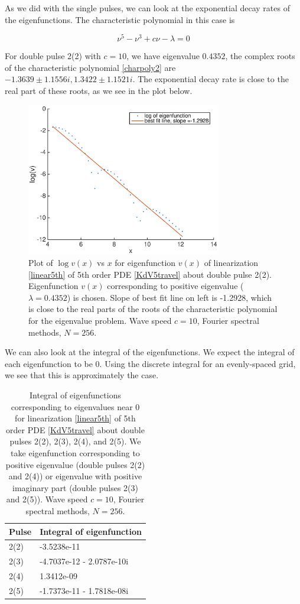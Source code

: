 \documentclass[12pt]{article}
\begin{document}
As we did with the single pulses, we can look at the exponential decay rates of the eigenfunctions. The characteristic polynomial in this case is 

\begin{equation} \label{charpoly2}
\nu^5 - \nu^3 + c \nu - \lambda = 0
\end{equation}

For double pulse 2(2) with $c = 10$, we have eigenvalue $0.4352$, the complex roots of the characteristic polynomial \eqref{charpoly2} are $-1.3639 \pm 1.1556i, 1.3422 \pm 1.1521i$. The exponential decay rate is close to the real part of these roots, as we see in the plot below.

\begin{figure}[H]
	\includegraphics[width=8.5cm]{decayeigenfunction}
	\caption{Plot of $\log v(x)$ vs $x$ for eigenfunction $v(x)$ of linearization \eqref{linear5th} of 5th order PDE \eqref{KdV5travel} about double pulse 2(2). Eigenfunction $v(x)$ corresponding to positive eigenvalue ($\lambda = 0.4352$) is chosen. Slope of best fit line on left is -1.2928, which is close to the real parts of the roots of the characteristic polynomial for the eigenvalue problem. Wave speed $c = 10$, Fourier spectral methods, $N = 256$.}
\end{figure}

We can also look at the integral of the eigenfunctions. We expect the integral of each eigenfunction to be 0. Using the discrete integral for an evenly-spaced grid, we see that this is approximately the case.

\begin{table}[H]
\begin{tabular}{l|l}
Pulse  & Integral of eigenfunction \\ \hline
2(2)   & -3.5238e-11   \\
2(3)   & -4.7037e-12 - 2.0787e-10i  \\
2(4)   & 1.3412e-09  \\
2(5)   & -1.7373e-11 - 1.7818e-08i  \\
\end{tabular}
\caption{Integral of eigenfunctions corresponding to eigenvalues near 0 for linearization \eqref{linear5th} of 5th order PDE \eqref{KdV5travel} about double pulses 2(2), 2(3), 2(4), and 2(5). We take eigenfunction corresponding to positive eigenvalue (double pulses 2(2) and 2(4)) or eigenvalue with positive imaginary part (double pulses 2(3) and 2(5)). Wave speed $c = 10$, Fourier spectral methods, $N = 256$.}
\end{table}
\end{document}
